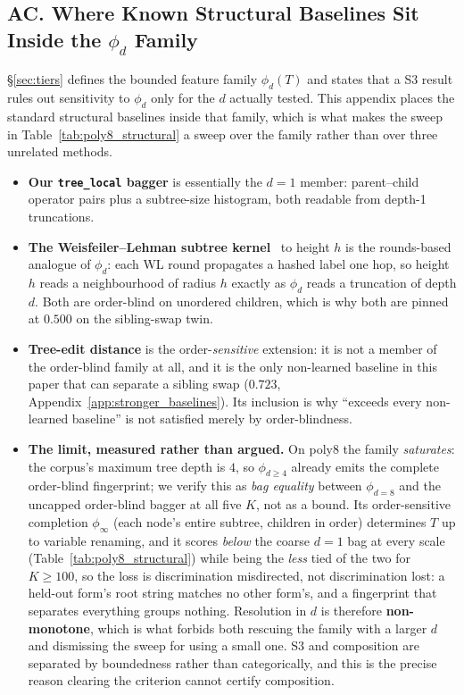 \subsection*{AC. Where Known Structural Baselines Sit Inside the $\phi_d$ Family}

\S\ref{sec:tiers} defines the bounded feature family $\phi_d(T)$ and states that a S3 result rules out sensitivity to $\phi_d$ only for the $d$ actually tested. This appendix places the standard structural baselines inside that family, which is what makes the sweep in Table~\ref{tab:poly8_structural} a sweep over the family rather than over three unrelated methods.

\begin{itemize}[noitemsep,topsep=2pt,leftmargin=1.4em]
  \item \textbf{Our \texttt{tree\_local} bagger} is essentially the $d{=}1$ member: parent--child operator pairs plus a subtree-size histogram, both readable from depth-1 truncations.
  \item \textbf{The Weisfeiler--Lehman subtree kernel}~\citep{shervashidze2011weisfeiler} to height $h$ is the rounds-based analogue of $\phi_d$: each WL round propagates a hashed label one hop, so height $h$ reads a neighbourhood of radius $h$ exactly as $\phi_{d}$ reads a truncation of depth $d$. Both are order-blind on unordered children, which is why both are pinned at $0.500$ on the sibling-swap twin.
  \item \textbf{Tree-edit distance} is the order-\emph{sensitive} extension: it is not a member of the order-blind family at all, and it is the only non-learned baseline in this paper that can separate a sibling swap ($0.723$, Appendix~\ref{app:stronger_baselines}). Its inclusion is why ``exceeds every non-learned baseline'' is not satisfied merely by order-blindness.
  \item \textbf{The limit, measured rather than argued.} On poly8 the family \emph{saturates}: the corpus's maximum tree depth is $4$, so $\phi_{d\geq4}$ already emits the complete order-blind fingerprint; we verify this as \emph{bag equality} between $\phi_{d{=}8}$ and the uncapped order-blind bagger at all five $K$, not as a bound. Its order-sensitive completion $\phi_\infty$ (each node's entire subtree, children in order) determines $T$ up to variable renaming, and it scores \emph{below} the coarse $d{=}1$ bag at every scale (Table~\ref{tab:poly8_structural}) while being the \emph{less} tied of the two for $K{\geq}100$, so the loss is discrimination misdirected, not discrimination lost: a held-out form's root string matches no other form's, and a fingerprint that separates everything groups nothing. Resolution in $d$ is therefore \textbf{non-monotone}, which is what forbids both rescuing the family with a larger $d$ and dismissing the sweep for using a small one. S3 and composition are separated by boundedness rather than categorically, and this is the precise reason clearing the criterion cannot certify composition.
\end{itemize}

